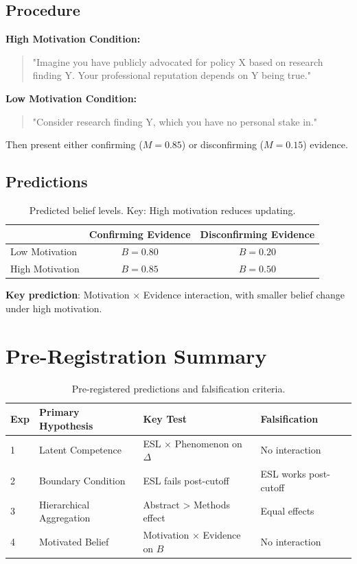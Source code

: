 \documentclass[11pt,a4paper]{article}
\begin{document}
\subsection{Procedure}

\textbf{High Motivation Condition:}
\begin{quote}
"Imagine you have publicly advocated for policy X based on research finding Y. Your professional reputation depends on Y being true."
\end{quote}

\textbf{Low Motivation Condition:}
\begin{quote}
"Consider research finding Y, which you have no personal stake in."
\end{quote}

Then present either confirming ($M = 0.85$) or disconfirming ($M = 0.15$) evidence.

\subsection{Predictions}

\begin{table}[h]
\centering
\begin{tabular}{lcc}
\toprule
 & \textbf{Confirming Evidence} & \textbf{Disconfirming Evidence} \\
\midrule
Low Motivation & $B = 0.80$ & $B = 0.20$ \\
High Motivation & $B = 0.85$ & $B = 0.50$ \\
\bottomrule
\end{tabular}
\caption{Predicted belief levels. Key: High motivation reduces updating.}
\end{table}

\textbf{Key prediction}: Motivation $\times$ Evidence interaction, with smaller belief change under high motivation.


\section{Pre-Registration Summary}

\begin{table}[h]
\centering
\begin{tabular}{llll}
\toprule
\textbf{Exp} & \textbf{Primary Hypothesis} & \textbf{Key Test} & \textbf{Falsification} \\
\midrule
1 & Latent Competence & ESL $\times$ Phenomenon on $\Delta$ & No interaction \\
2 & Boundary Condition & ESL fails post-cutoff & ESL works post-cutoff \\
3 & Hierarchical Aggregation & Abstract > Methods effect & Equal effects \\
4 & Motivated Belief & Motivation $\times$ Evidence on $B$ & No interaction \\
\bottomrule
\end{tabular}
\caption{Pre-registered predictions and falsification criteria.}
\end{table}
\end{document}
